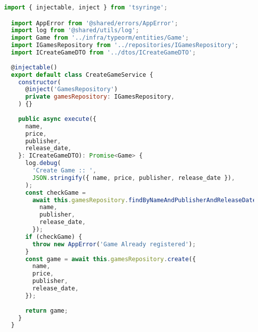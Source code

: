 \begin{lstlisting}[language=JavaScript, caption={O Caso de Uso CreateGameService.ts},captionpos=b, label=alg:creategameservice]
  import { injectable, inject } from 'tsyringe';

  import AppError from '@shared/errors/AppError';
  import log from '@shared/utils/log';
  import Game from '../infra/typeorm/entities/Game';
  import IGamesRepository from '../repositories/IGamesRepository';
  import ICreateGameDTO from '../dtos/ICreateGameDTO';
  
  @injectable()
  export default class CreateGameService {
    constructor(
      @inject('GamesRepository')
      private gamesRepository: IGamesRepository,
    ) {}
  
    public async execute({
      name,
      price,
      publisher,
      release_date,
    }: ICreateGameDTO): Promise<Game> {
      log.debug(
        'Create Game :: ',
        JSON.stringify({ name, price, publisher, release_date }),
      );
      const checkGame =
        await this.gamesRepository.findByNameAndPublisherAndReleaseDate({
          name,
          publisher,
          release_date,
        });
      if (checkGame) {
        throw new AppError('Game Already registered');
      }
      const game = await this.gamesRepository.create({
        name,
        price,
        publisher,
        release_date,
      });
  
      return game;
    }
  }
  
  \end{lstlisting}
  